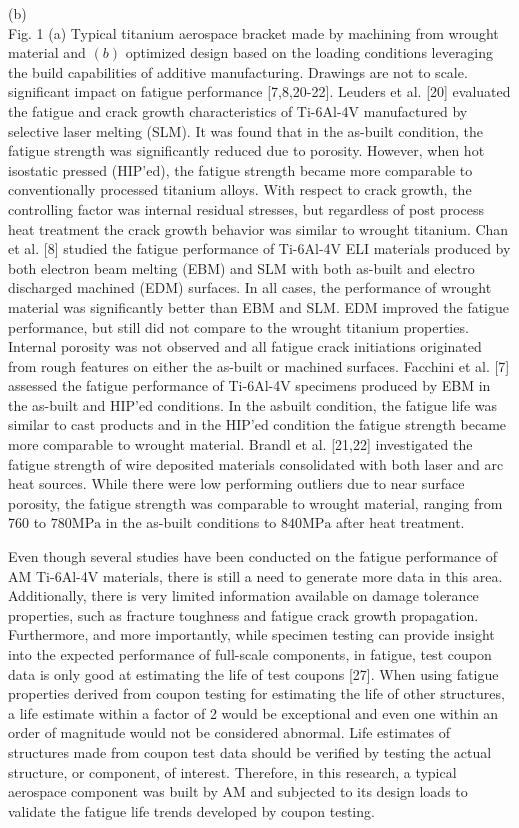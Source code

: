 \documentclass[10pt]{article}
\begin{document}
(b)\\
Fig. 1 (a) Typical titanium aerospace bracket made by machining from wrought material and $(b)$ optimized design based on the loading conditions leveraging the build capabilities of additive manufacturing. Drawings are not to scale.\\
significant impact on fatigue performance [7,8,20-22]. Leuders et al. [20] evaluated the fatigue and crack growth characteristics of Ti-6Al-4V manufactured by selective laser melting (SLM). It was found that in the as-built condition, the fatigue strength was significantly reduced due to porosity. However, when hot isostatic pressed (HIP'ed), the fatigue strength became more comparable to conventionally processed titanium alloys. With respect to crack growth, the controlling factor was internal residual stresses, but regardless of post process heat treatment the crack growth behavior was similar to wrought titanium. Chan et al. [8] studied the fatigue performance of Ti-6Al-4V ELI materials produced by both electron beam melting (EBM) and SLM with both as-built and electro discharged machined (EDM) surfaces. In all cases, the performance of wrought material was significantly better than EBM and SLM. EDM improved the fatigue performance, but still did not compare to the wrought titanium properties. Internal porosity was not observed and all fatigue crack initiations originated from rough features on either the as-built or machined surfaces. Facchini et al. [7] assessed the fatigue performance of Ti-6Al-4V specimens produced by EBM in the as-built and HIP'ed conditions. In the asbuilt condition, the fatigue life was similar to cast products and in the HIP'ed condition the fatigue strength became more comparable to wrought material. Brandl et al. [21,22] investigated the fatigue strength of wire deposited materials consolidated with both laser and arc heat sources. While there were low performing outliers due to near surface porosity, the fatigue strength was comparable to wrought material, ranging from 760 to $780 \mathrm{MPa}$ in the as-built conditions to $840 \mathrm{MPa}$ after heat treatment.

Even though several studies have been conducted on the fatigue performance of AM Ti-6Al-4V materials, there is still a need to generate more data in this area. Additionally, there is very limited information available on damage tolerance properties, such as fracture toughness and fatigue crack growth propagation. Furthermore, and more importantly, while specimen testing can provide insight into the expected performance of full-scale components, in fatigue, test coupon data is only good at estimating the life of test coupons [27]. When using fatigue properties derived from coupon testing for estimating the life of other structures, a life estimate within a factor of 2 would be exceptional and even one within an order of magnitude would not be considered abnormal. Life estimates of structures made from coupon test data should be verified by testing the actual structure, or component, of interest. Therefore, in this research, a typical aerospace component was built by $\mathrm{AM}$ and subjected to its design loads to validate the fatigue life trends developed by coupon testing.
\end{document}
